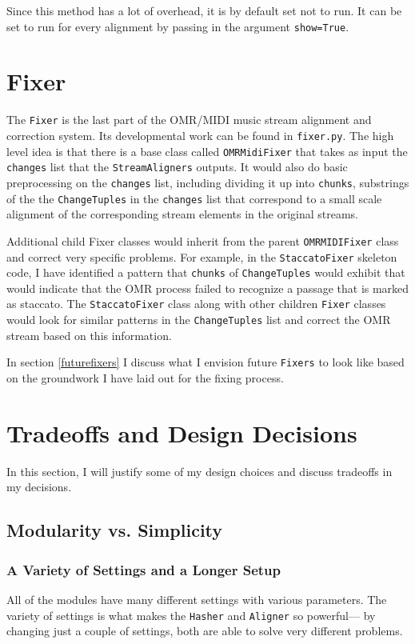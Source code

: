 Since this method has a lot of overhead, it is by default set not to run. It can be set to run for every alignment by passing in the argument \texttt{show=True}. 

\section{Fixer} \label{fixer}
The \texttt{Fixer} is the last part of the OMR/MIDI music stream alignment and correction system. Its developmental work can be found in \texttt{fixer.py}. The high level idea is that there is a base class called \texttt{OMRMidiFixer} that takes as input the \texttt{changes} list that the \texttt{StreamAligners} outputs. It would also do basic preprocessing on the \texttt{changes} list, including dividing it up into \texttt{chunks}, substrings of the the \texttt{ChangeTuples} in the \texttt{changes} list that correspond to a small scale alignment of the corresponding stream elements in the original streams. 

Additional child Fixer classes would inherit from the parent \texttt{OMRMIDIFixer} class and correct very specific problems. For example, in the \texttt{StaccatoFixer} skeleton code, I have identified a pattern that \texttt{chunks} of \texttt{ChangeTuples} would exhibit that would indicate that the OMR process failed to recognize a passage that is marked as staccato. The \texttt{StaccatoFixer} class along with other children \texttt{Fixer} classes would look for similar patterns in the \texttt{ChangeTuples} list and correct the OMR stream based on this information. 

In section \ref{futurefixers} I discuss what I envision future \texttt{Fixers} to look like based on the groundwork I have laid out for the fixing process.

\section{Tradeoffs and Design Decisions}

In this section, I will justify some of my design choices and discuss tradeoffs in my decisions. 

\subsection{Modularity vs. Simplicity}
\subsubsection{A Variety of Settings and a Longer Setup}
All of the modules have many different settings with various parameters. The variety of settings is what makes the \texttt{Hasher} and \texttt{Aligner} so powerful--- by changing just a couple of settings, both are able to solve very different problems.

